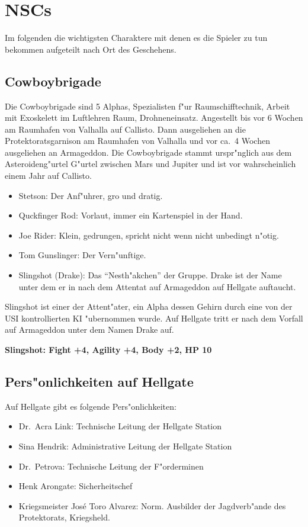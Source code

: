 \section{NSCs}

Im folgenden die wichtigsten Charaktere mit denen es die Spieler zu tun bekommen aufgeteilt nach Ort des Geschehens.

\subsection{Cowboybrigade}

Die Cowboybrigade sind 5 Alphas, Spezialisten f"ur Raumschifftechnik, Arbeit mit Exoskelett im Luftlehren Raum, Drohneneinsatz.
Angestellt bis vor 6 Wochen am Raumhafen von Valhalla auf Callisto. Dann ausgeliehen an die Protektoratsgarnison am Raumhafen von Valhalla und vor ca.~4 Wochen ausgeliehen an Armageddon. Die Cowboybrigade stammt urspr"nglich aus dem Asteroideng"urtel G"urtel zwischen Mars und Jupiter und ist vor wahrscheinlich einem Jahr auf Callisto.

\begin{itemize}
    \item Stetson: Der Anf"uhrer, gro\3 und dratig.
    \item Quckfinger Rod: Vorlaut, immer ein Kartenspiel in der Hand.
    \item Joe Rider: Klein, gedrungen, spricht nicht wenn nicht unbedingt n"otig.
    \item Tom Gunslinger: Der Vern"unftige.
    \item Slingshot (Drake): Das ``Nesth"akchen'' der Gruppe. Drake ist der Name unter dem er in nach dem Attentat auf Armageddon auf Hellgate auftaucht.
\end{itemize}

Slingshot ist einer der Attent"ater, ein Alpha dessen Gehirn durch eine von der USI kontrollierten KI "ubernommen wurde.
Auf Hellgate tritt er nach dem Vorfall auf Armageddon unter dem Namen Drake auf.

\textbf{Slingshot: Fight +4, Agility +4, Body +2, HP 10}

\newpage

\subsection{Pers"onlichkeiten auf Hellgate}

Auf Hellgate gibt es folgende Pers"onlichkeiten:

\begin{itemize}
    \item Dr.~Acra Link: Technische Leitung der Hellgate Station
    \item Sina Hendrik: Administrative Leitung der Hellgate Station
    \item Dr.~Petrova: Technische Leitung der F"orderminen
    \item Henk Arongate: Sicherheitschef    
    \item Kriegsmeister Jos\'{e} \frqq{}Toro\flqq{} Alvarez: Norm. Ausbilder der Jagdverb"ande des Protektorats, Kriegsheld.
\end{itemize}

